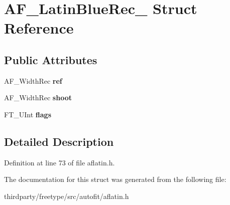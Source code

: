 \hypertarget{struct_a_f___latin_blue_rec__}{}\section{A\+F\+\_\+\+Latin\+Blue\+Rec\+\_\+ Struct Reference}
\label{struct_a_f___latin_blue_rec__}
\subsection*{Public Attributes}
\begin{DoxyCompactItemize}
\item 
\mbox{\label{struct_a_f___latin_blue_rec___aadfeeaaa93a60f7a28ca9ce86a745cde}} 
A\+F\+\_\+\+Width\+Rec {\bfseries ref}
\item 
\mbox{\label{struct_a_f___latin_blue_rec___adc90d39d01bb2a0825b8038bf1794143}} 
A\+F\+\_\+\+Width\+Rec {\bfseries shoot}
\item 
\mbox{\label{struct_a_f___latin_blue_rec___a4033a3bd6e031af3fe36ab6ae48c40bf}} 
F\+T\+\_\+\+U\+Int {\bfseries flags}
\end{DoxyCompactItemize}


\subsection{Detailed Description}


Definition at line 73 of file aflatin.\+h.



The documentation for this struct was generated from the following file\+:\begin{DoxyCompactItemize}
\item 
thirdparty/freetype/src/autofit/aflatin.\+h\end{DoxyCompactItemize}
